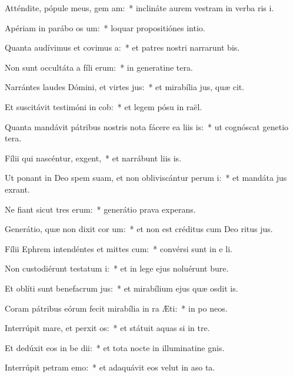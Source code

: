 \item Atténdite, pópule meus, gem am:~* inclináte aurem vestram in verba ris i.
\item Apériam in parábo os um:~* loquar propositiónes  intio.
\item Quanta audívimus et covimus a:~* et patres nostri narrarunt bis.
\item Non sunt occultáta a fíli erum:~* in generatine tera.
\item Narrántes laudes Dómini, et virtes jus:~* et mirabília jus, quæ cit.
\item Et suscitávit testimóni in cob:~* et legem pósu in raël.
\item Quanta mandávit pátribus nostris nota fácere ea liis is:~* ut cognóscat genetio tera.
\item Fílii qui nascéntur,  exgent,~* et narrábunt liis is.
\item Ut ponant in Deo spem suam, et non obliviscántur perum i:~* et mandáta jus exrant.
\item Ne fiant sicut tres erum:~* generátio prava  experans.
\item Generátio, quæ non dixit cor um:~* et non est créditus cum Deo ritus jus.
\item Fílii Ephrem intendéntes et mittes cum:~* convérsi sunt in e li.
\item Non custodiérunt testatum i:~* et in lege ejus noluérunt bure.
\item Et oblíti sunt benefacrum jus:~* et mirabílium ejus quæ osdit is.
\item Coram pátribus eórum fecit mirabília in ra Æti:~* in po neos.
\item Interrúpit mare, et perxit os:~* et státuit aquas si in tre.
\item Et dedúxit eos in be dii:~* et tota nocte in illuminatine gnis.
\item Interrúpit petram  emo:~* et adaquávit eos velut in aso ta.
